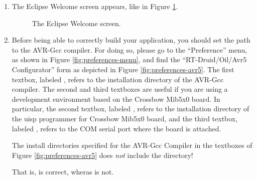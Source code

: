 \begin{enumerate}
\item
  The Eclipse Welcome screen appears, like in Figure \ref{fig:welcome}.
%
\begin{figure}[htb]
\caption{The Eclipse Welcome screen.}
\label{fig:welcome}
\end{figure}

\item
Before being able to correctly build your application, you should set
the path to the AVR-Gcc compiler. For doing so, please go to the
``Preference'' menu, as shown in Figure \ref{fig:preferences-menu},
and find the ``RT-Druid/Oil/Avr5 Configurator'' form as depicted in
Figure \ref{fig:preferences-avr5}.  The first textbox, labeled
, refers to the installation directory of the AVR-Gcc
compiler.  The second and third textboxes are useful if you are using
a development environment based on the Crossbow Mib5x0 board. In
particular, the second textbox, labeled , refers to
the installation directory of the uisp programmer for Crossbow Mib5x0
board, and the third textbox, labeled ,
refers to the COM serial port where the board is attached.

\begin{warning}
The install directories specified for the AVR-Gcc Compiler in the textboxes 
of Figure \ref{fig:preferences-avr5} does {\em not} include the 
directory! 

That is,  is correct, wheras
 is not.
\end{warning}



\end{enumerate}
